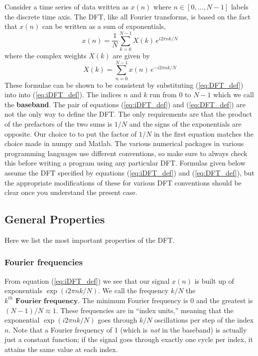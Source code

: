 Consider a time series of data written as $x(n)$ where $n \in [0,\dots,N-1]$ labels the discrete time axis.
The DFT, like all Fourier transforms, is based on the fact that $x(n)$ can be written as a sum of exponentials,
\begin{equation}
x(n)=\frac{1}{N}\sum_{k=0}^{N-1}X(k)\, e^{i2\pi nk/N} \label{eq:iDFT_def}
\end{equation}
where the complex weights $X(k)$ are given by
\begin{equation}
X(k)=\sum_{n=0}^{N-1}x(n)\, e^{-i2\pi nk/N} \label{eq:DFT_def}
\end{equation}
These formulae can be shown to be consistent by substituting (\ref{eq:DFT_def}) into  into (\ref{eq:iDFT_def}).
The indices $n$ and $k$ run from $0$ to $N-1$ which we call the \textbf{baseband}.
The pair of equations (\ref{eq:iDFT_def}) and (\ref{eq:DFT_def}) are not the only way to define the DFT.
The only requirements are that the product of the prefactors of the two sums is $1/N$ and the signs of the exponentials are opposite.
Our choice to to put the factor of $1/N$ in the first equation matches the choice made in numpy and Matlab.
The various numerical packages in various programming languages use different conventions, so make sure to always check this before writing a program using any particular DFT.
Formulas given below assume the DFT specified by equations (\ref{eq:iDFT_def}) and (\ref{eq:DFT_def}), but the appropriate modifications of these for various DFT conventions should be clear once you understand the present case.


\subsection{General Properties}

Here we list the most important properties of the DFT. 

\subsubsection{Fourier frequencies}

From equation (\ref{eq:iDFT_def}) we see that our signal $x(n)$ is built up of exponentials $\exp(i2\pi nk/N)$.
We call the frequency $k/N$ the $k^{th}\textbf{ Fourier frequency}$.
The minimum Fourier frequency is 0 and the greatest is $(N-1)/N\approx1$.
These frequencies are in ``index units,'' meaning that the exponential $\exp(i 2 \pi n k / N)$ goes through $k/N$ oscillations per step of the index $n$.
Note that a Fourier frequency of 1 (which is \emph{not} in the baseband) is actually just a constant function; if the signal goes through exactly one cycle per index, it attains the same value at each index.


